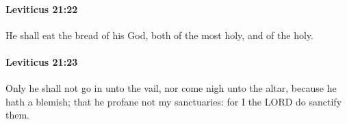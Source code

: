 		\paragraph{Leviticus 21:22} %
			\label{LEVITICUS-21-22}

			He shall eat the bread of his God, both of the most holy, and of the holy.


		\paragraph{Leviticus 21:23} %
			\label{LEVITICUS-21-23}

			Only he shall not go in unto the vail, nor come nigh unto the altar, because he hath a blemish; that he profane not my sanctuaries: for I the LORD do sanctify them.


